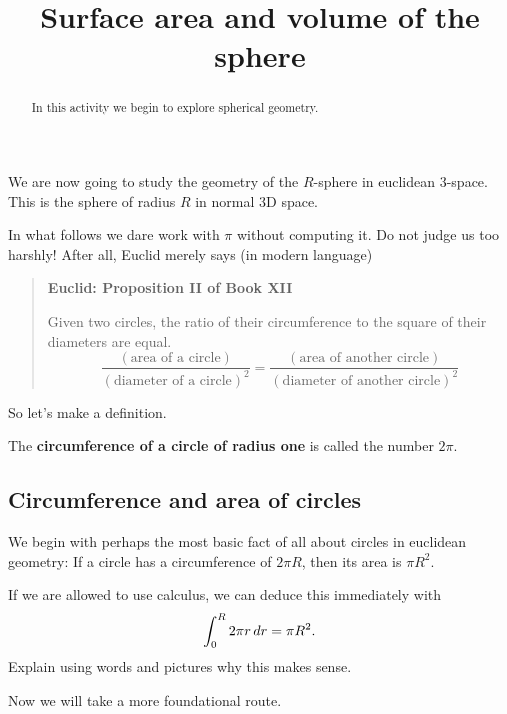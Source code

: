 \documentclass[hints,handout,noauthor,nooutcomes,12pt]{ximera}
\title{Surface area and volume of the sphere}
\begin{document}
\begin{abstract}
In this activity we begin to explore spherical geometry.
\end{abstract}
\maketitle


We are now going to study the geometry of the $R$-sphere in euclidean
$3$-space. This is the sphere of radius $R$ in normal $3$D space.



In what follows we dare work with $\pi$ without computing it. Do not
judge us too harshly! After all, Euclid merely says (in modern language)
\begin{quote}
  \textbf{Euclid: Proposition II of Book XII}
  
  Given two circles, the ratio of their circumference to the square of
  their diameters are equal.
  \[
  \frac{(\text{area of a circle})}{(\text{diameter of a circle})^2} =
  \frac{(\text{area of another circle})}{(\text{diameter of another
      circle})^2}
  \]
\end{quote}

So let's make a definition.

\begin{definition}
  The \textbf{circumference of a circle of radius one} is called the number $2\pi$.
\end{definition}

\subsection{Circumference and area of circles}

We begin with perhaps the most basic fact of all about circles in
euclidean geometry: If a circle has a circumference of $2\pi R$, then
its area is $\pi R^2$.

\begin{problem}
  If we are allowed to use calculus, we can deduce this immediately with
  \[
  \int_0^R 2\pi r \,d r = \pi R^2.
  \]
  Explain using words and pictures why this makes sense.
\end{problem}


Now we will take a more foundational route.
\end{document}
